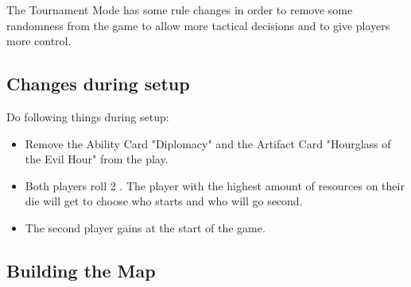 
\begin{multicols*}{2}

The Tournament Mode has some rule changes in order to remove some randomness from the game to allow more tactical decisions and to give players more control.

\subsection*{Changes during setup}

Do following things during setup:
\begin{itemize}
    \item Remove the Ability Card "Diplomacy" and the Artifact Card "Hourglass of the Evil Hour" from the play.
    \item Both players roll 2 . The player with the highest amount of resources on their die will get to choose who starts and who will go second.
    \item The second player gains  at the start of the game.
\end{itemize}
\subsection*{Building the Map}


\end{multicols*}

